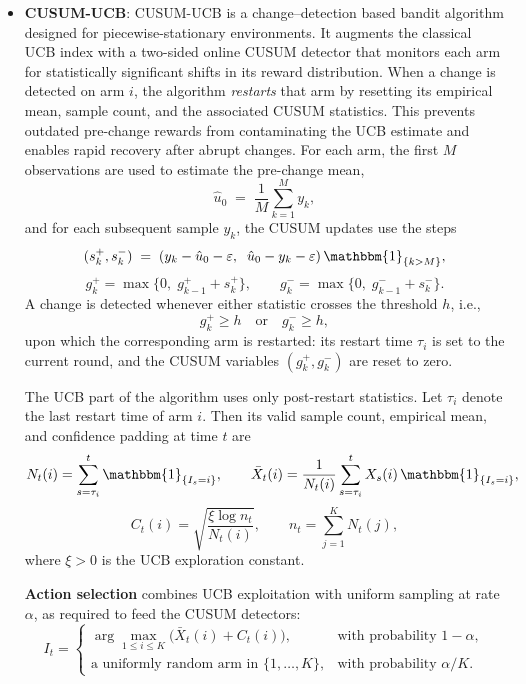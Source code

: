 \documentclass[pdflatex,sn-mathphys-num]{sn-jnl}
\theoremstyle{thmstyleone}%
\theoremstyle{thmstyletwo}%
\theoremstyle{thmstylethree}%
\begin{document}
\begin{itemize}
The additive term
\[
    \frac{e{\alpha}}{K}\sum_{i=1}^K w_i(t)
\]
helps the algorithm adapt to environments where the best arm switches,
enabling regret bounds that depend on the number of switches rather than on~$T$ alone.


\item \textbf{CUSUM-UCB}\cite{cusumucb}:
CUSUM-UCB is a change–detection based bandit algorithm designed for
piecewise-stationary environments. It augments the classical UCB index
with a two-sided online CUSUM detector that monitors each arm for
statistically significant shifts in its reward distribution. When a
change is detected on arm $i$, the algorithm \emph{restarts} that arm by
resetting its empirical mean, sample count, and the associated CUSUM
statistics. This prevents outdated pre-change rewards from contaminating
the UCB estimate and enables rapid recovery after abrupt changes.
For each arm, the first $M$ observations are used to estimate the
pre-change mean,
\[
\hat u_0 \;=\; \frac{1}{M}\sum_{k=1}^{M} y_k,
\]
and for each subsequent sample $y_k$, the CUSUM updates use the steps
\[
(s_k^+, s_k^-) \;=\; (y_k - \hat u_0 - \varepsilon,\;\; \hat u_0 - y_k - \varepsilon)\,\mathbbm{1}_{\{k > M\}},
\]
\[
g_k^+ = \max\{0,\; g_{k-1}^+ + s_k^+\}, \qquad 
g_k^- = \max\{0,\; g_{k-1}^- + s_k^-\}.
\]
A change is detected whenever either statistic crosses the threshold $h$,
i.e.,
\[
g_k^+ \ge h \quad \text{or} \quad g_k^- \ge h,
\]
upon which the corresponding arm is restarted:
its restart time $\tau_i$ is set to the current round, and the CUSUM
variables $(g_k^+, g_k^-)$ are reset to zero.

The UCB part of the algorithm uses only post-restart statistics.
Let $\tau_i$ denote the last restart time of arm $i$. Then its valid
sample count, empirical mean, and confidence padding at time $t$ are
\[
N_t(i) = \sum_{s=\tau_i}^{t} \mathbbm{1}_{\{I_s = i\}}, \qquad
\bar X_t(i) = \frac{1}{N_t(i)}\sum_{s=\tau_i}^{t} X_s(i)\,\mathbbm{1}_{\{I_s = i\}},
\]
\[
C_t(i) = \sqrt{\frac{\xi \log n_t}{N_t(i)}}, \qquad
n_t = \sum_{j=1}^{K} N_t(j),
\]
where $\xi > 0$ is the UCB exploration constant.

\textbf{Action selection} combines UCB exploitation with uniform
sampling at rate $\alpha$, as required to feed the CUSUM detectors:
\[
I_t = 
\begin{cases}
\displaystyle \arg\max_{1\le i\le K}\bigl(\bar X_t(i) + C_t(i)\bigr), & \text{with probability } 1 - \alpha,\\[8pt]
\text{a uniformly random arm in }\{1,\dots,K\}, & \text{with probability } \alpha/K.
\end{cases}
\]


\end{itemize}
\end{document}
